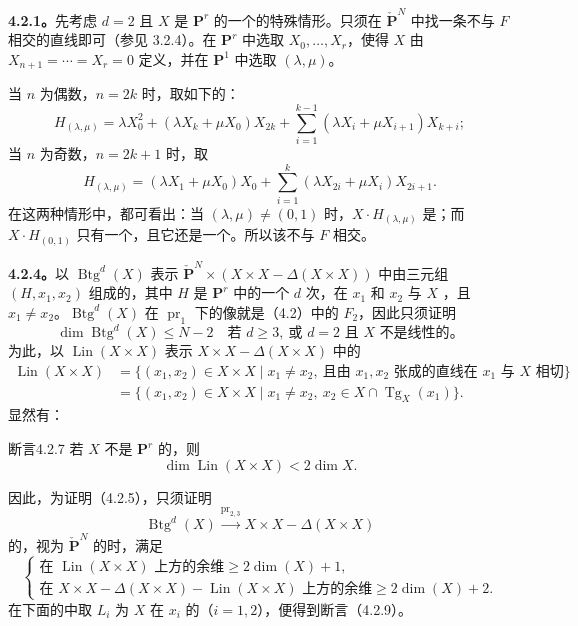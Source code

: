 \textbf{4.2.1。}先考虑 $d=2$ 且 $X$ 是 $\mathbf P^r$ 的一个的特殊情形。只须在 $\check{\mathbf P}^{N}$ 中找一条不与 $F$ 相交的直线即可（参见 3.2.4）。在 $\mathbf P^r$ 中选取 $X_0,\ldots,X_r$，使得 $X$ 由
$X_{n+1}=\cdots=X_r=0$ 定义，并在 $\mathbf P^1$ 中选取 $(\lambda,\mu)$。

当 $n$ 为偶数，$n=2k$ 时，取如下的：
\[
H_{(\lambda,\mu)}=
\lambda X_0^2+(\lambda X_k+\mu X_0)X_{2k}
+\sum_{i=1}^{k-1}(\lambda X_i+\mu X_{i+1})X_{k+i};
\tag{4.2.2}
\]
当 $n$ 为奇数，$n=2k+1$ 时，取
\[
H_{(\lambda,\mu)}=(\lambda X_1+\mu X_0)X_0
+\sum_{i=1}^{k}(\lambda X_{2i}+\mu X_i)X_{2i+1}.
\tag{4.2.3}
\]
在这两种情形中，都可看出：当 $(\lambda,\mu)\ne(0,1)$ 时，$X\cdot H_{(\lambda,\mu)}$ 是；而 $X\cdot H_{(0,1)}$ 只有一个，且它还是一个。所以该不与 $F$ 相交。

\textbf{4.2.4。}以 $\operatorname{Btg}^{d}(X)$ 表示
$\check{\mathbf P}^{N}\times(X\times X-\Delta(X\times X))$ 中由三元组 $(H,x_1,x_2)$ 组成的，其中 $H$ 是 $\mathbf P^r$ 中的一个 $d$ 次，在 $x_1$ 和 $x_2$ 与 $X$ ，且 $x_1\ne x_2$。$\operatorname{Btg}^{d}(X)$ 在 $\operatorname{pr}_1$ 下的像就是（4.2）中的 $F_2$，因此只须证明
\[
\dim\operatorname{Btg}^{d}(X)\leq N-2
\quad\text{若 }d\geq3,\ \text{或 }d=2\text{ 且 }X\text{ 不是线性的}。
\tag{4.2.5}
\]
为此，以 $\operatorname{Lin}(X\times X)$ 表示 $X\times X-\Delta(X\times X)$ 中的
\[
\begin{aligned}
\operatorname{Lin}(X\times X)
&=\{(x_1,x_2)\in X\times X\mid x_1\ne x_2,\ \text{且由 }x_1,x_2
\text{ 张成的直线在 }x_1\text{ 与 }X\text{ 相切}\}\\
&=\{(x_1,x_2)\in X\times X\mid x_1\ne x_2,\ x_2\in X\cap\operatorname{Tg}_X(x_1)\}.
\end{aligned}
\tag{4.2.6}
\]
显然有：
\begin{SGAresult}{断言}{4.2.7}
若 $X$ 不是 $\mathbf P^r$ 的，则
\[
\dim\operatorname{Lin}(X\times X)<2\dim X.
\]
\end{SGAresult}
因此，为证明（4.2.5），只须证明
\[
\operatorname{Btg}^{d}(X)\xrightarrow{\operatorname{pr}_{2,3}}
X\times X-\Delta(X\times X)
\tag{4.2.8}
\]
的，视为 $\check{\mathbf P}^{N}$ 的时，满足
\[
\begin{cases}
\text{在 }\operatorname{Lin}(X\times X)\text{ 上方的余维}\geq2\dim(X)+1,\\
\text{在 }X\times X-\Delta(X\times X)-\operatorname{Lin}(X\times X)
\text{ 上方的余维}\geq2\dim(X)+2.
\end{cases}
\tag{4.2.9}
\]
在下面的中取 $L_i$ 为 $X$ 在 $x_i$ 的（$i=1,2$），便得到断言（4.2.9）。

